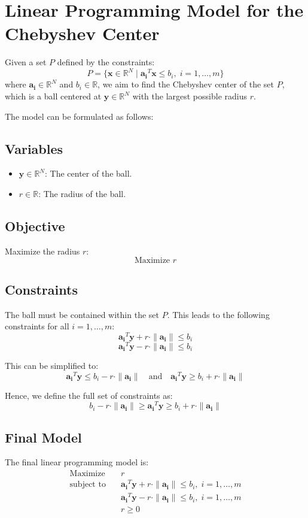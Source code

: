 \documentclass{article}
\begin{document}
\section*{Linear Programming Model for the Chebyshev Center}

Given a set \( P \) defined by the constraints:
\[
P = \{ \mathbf{x} \in \mathbb{R}^N \mid \mathbf{a_i}^T \mathbf{x} \leq b_i, \; i = 1, \ldots, m \}
\]
where \( \mathbf{a_i} \in \mathbb{R}^N \) and \( b_i \in \mathbb{R} \), we aim to find the Chebyshev center of the set \( P \), which is a ball centered at \( \mathbf{y} \in \mathbb{R}^N \) with the largest possible radius \( r \).

The model can be formulated as follows:

\subsection*{Variables}
\begin{itemize}
    \item \( \mathbf{y} \in \mathbb{R}^N \): The center of the ball.
    \item \( r \in \mathbb{R} \): The radius of the ball.
\end{itemize}

\subsection*{Objective}
Maximize the radius \( r \):
\[
\text{Maximize } r
\]

\subsection*{Constraints}
The ball must be contained within the set \( P \). This leads to the following constraints for all \( i = 1, \ldots, m \):
\[
\mathbf{a_i}^T \mathbf{y} + r \cdot \|\mathbf{a_i}\| \leq b_i
\]
\[
\mathbf{a_i}^T \mathbf{y} - r \cdot \|\mathbf{a_i}\| \leq b_i
\]

This can be simplified to:
\[
\mathbf{a_i}^T \mathbf{y} \leq b_i - r \cdot \|\mathbf{a_i}\| \quad \text{and} \quad \mathbf{a_i}^T \mathbf{y} \geq b_i + r \cdot \|\mathbf{a_i}\| 
\]

Hence, we define the full set of constraints as:
\[
b_i - r \cdot \|\mathbf{a_i}\| \geq \mathbf{a_i}^T \mathbf{y} \geq b_i + r \cdot \|\mathbf{a_i}\|
\]

\subsection*{Final Model}
The final linear programming model is:
\[
\begin{align*}
\text{Maximize} & \quad r \\
\text{subject to} & \quad \mathbf{a_i}^T \mathbf{y} + r \cdot \|\mathbf{a_i}\| \leq b_i, \; i = 1, \ldots, m \\
& \quad \mathbf{a_i}^T \mathbf{y} - r \cdot \|\mathbf{a_i}\| \leq b_i, \; i = 1, \ldots, m \\
& \quad r \geq 0
\end{align*}
\]
\end{document}
